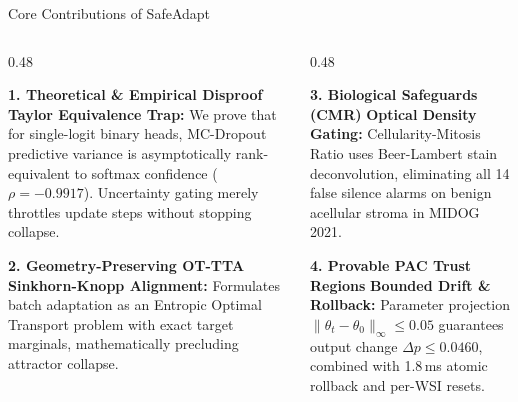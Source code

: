\documentclass[aspectratio=169,10pt]{beamer}
\begin{document}
\begin{frame}{Core Contributions of SafeAdapt}
    \begin{columns}[T]
        \begin{column}{0.48\textwidth}
            \begin{block}{\textbf{1. Theoretical & Empirical Disproof}}
                \small
                \textbf{Taylor Equivalence Trap:} We prove that for single-logit binary heads, MC-Dropout predictive variance is asymptotically rank-equivalent to softmax confidence ($\rho = -0.9917$). Uncertainty gating merely throttles update steps without stopping collapse.
            \end{block}
            \vspace{0.2cm}
            \begin{block}{\textbf{2. Geometry-Preserving OT-TTA}}
                \small
                \textbf{Sinkhorn-Knopp Alignment:} Formulates batch adaptation as an Entropic Optimal Transport problem with exact target marginals, mathematically precluding attractor collapse.
            \end{block}
        \end{column}
        \begin{column}{0.48\textwidth}
            \begin{block}{\textbf{3. Biological Safeguards (CMR)}}
                \small
                \textbf{Optical Density Gating:} Cellularity-Mitosis Ratio uses Beer-Lambert stain deconvolution, eliminating all 14 false silence alarms on benign acellular stroma in MIDOG 2021.
            \end{block}
            \vspace{0.2cm}
            \begin{block}{\textbf{4. Provable PAC Trust Regions}}
                \small
                \textbf{Bounded Drift & Rollback:} Parameter projection $\|\theta_t - \theta_0\|_\infty \le 0.05$ guarantees output change $\Delta p \le 0.0460$, combined with 1.8\,ms atomic rollback and per-WSI resets.
            \end{block}
        \end{column}
    \end{columns}
\end{frame}
\end{document}
